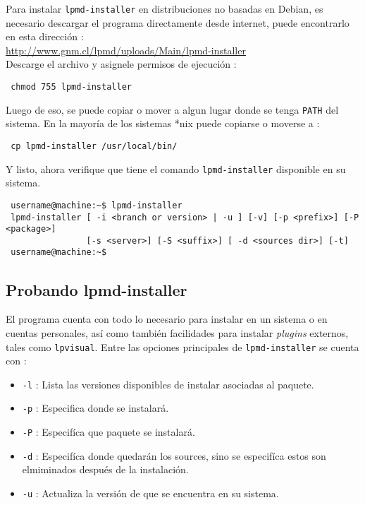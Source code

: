 Para instalar \verb|lpmd-installer| en distribuciones no basadas en Debian, es necesario descargar el programa directamente desde internet, puede encontrarlo en esta direcci\'on :\\

\url{http://www.gnm.cl/lpmd/uploads/Main/lpmd-installer}\\

Descarge el archivo y asignele permisos de ejecuci\'on :

\begin{verbatim}
 chmod 755 lpmd-installer
\end{verbatim}

Luego de eso, se puede copiar o mover a algun lugar donde se tenga \verb|PATH| del sistema. En la mayor\'ia de los sistemas *nix puede copiarse o moverse a :

\begin{verbatim}
 cp lpmd-installer /usr/local/bin/
\end{verbatim}

Y listo, ahora verifique que tiene el comando \verb|lpmd-installer| disponible en su sistema.
\begin{verbatim}
 username@machine:~$ lpmd-installer 
 lpmd-installer [ -i <branch or version> | -u ] [-v] [-p <prefix>] [-P <package>] 
                [-s <server>] [-S <suffix>] [ -d <sources dir>] [-t]
 username@machine:~$
\end{verbatim}

\subsection{Probando lpmd-installer}
El programa cuenta con todo lo necesario para instalar {\lpmd} en un sistema o en cuentas personales, as\'i como tambi\'en facilidades para instalar \textit{plugins} externos, tales como \verb|lpvisual|. Entre las opciones principales de \verb|lpmd-installer| se cuenta con :

\begin{itemize}
 \item \verb|-l| : Lista las versiones disponibles de instalar asociadas al paquete.
 \item \verb|-p| : Especifica donde se instalar\'a.
 \item \verb|-P| : Especif\'ica que paquete se instalar\'a.
 \item \verb|-d| : Especif\'ica donde quedar\'an los sources, sino se especif\'ica estos son elmiminados despu\'es de la instalaci\'on.
 \item \verb|-u| : Actualiza la versi\'on de {\lpmd} que se encuentra en su sistema.
\end{itemize}

